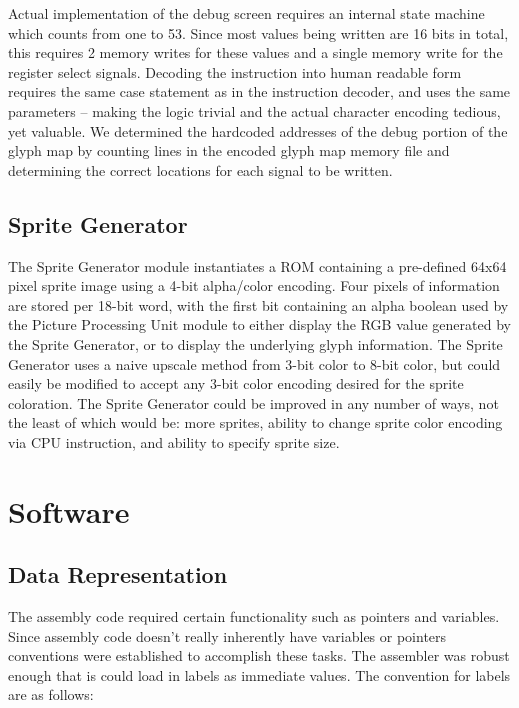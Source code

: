 \documentclass[letterpaper, 11 pt, conference]{article}
\begin{document}
Actual implementation of the debug screen requires an internal state machine which counts from one to 53.  Since most values being written are 16 bits in total, this requires 2 memory writes for these values and a single memory write for the register select signals.  Decoding the instruction into human readable form requires the same case statement as in the instruction decoder, and uses the same parameters -- making the logic trivial and the actual character encoding tedious, yet valuable.  We determined the hardcoded addresses of the debug portion of the glyph map by counting lines in the encoded glyph map memory file and determining the correct locations for each signal to be written.

\subsection{Sprite Generator}

The Sprite Generator module instantiates a ROM containing a pre-defined 64x64 pixel sprite image using a 4-bit alpha/color encoding.  Four pixels of information are stored per 18-bit word, with the first bit containing an alpha boolean used by the Picture Processing Unit module to either display the RGB value generated by the Sprite Generator, or to display the underlying glyph information.  The Sprite Generator uses a naive upscale method from 3-bit color to 8-bit color, but could easily be modified to accept any 3-bit color encoding desired for the sprite coloration.  The Sprite Generator could be improved in any number of ways, not the least of which would be: more sprites, ability to change sprite color encoding via CPU instruction, and ability to specify sprite size.



\section{Software}

\subsection{Data Representation}
\label{data_rep}

The assembly code required certain functionality such as pointers and variables. Since assembly code doesn’t really inherently have variables or pointers conventions were established to accomplish these tasks. The assembler was robust enough that is could load in labels as immediate values. The convention for labels are as follows:
\end{document}
